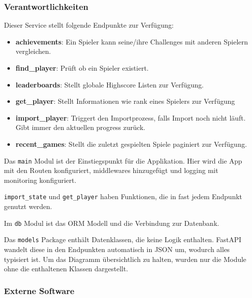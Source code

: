\subsubsection{Verantwortlichkeiten}

Dieser Service stellt folgende Endpunkte zur Verfügung:
\begin{itemize}
    \item \textbf{achievements}: Ein Spieler kann seine/ihre Challenges mit anderen Spielern vergleichen.
    \item \textbf{find\_player}: Prüft ob ein Spieler existiert.
    \item \textbf{leaderboards}: Stellt globale Highscore Listen zur Verfügung.
    \item \textbf{get\_player}: Stellt Informationen wie rank eines Spielers zur Verfügung
    \item \textbf{import\_player}: Triggert den Importprozess, falls Import noch nicht läuft.
    Gibt immer den aktuellen progress zurück.
    \item \textbf{recent\_games}: Stellt die zuletzt gespielten Spiele paginiert zur Verfügung.
\end{itemize}

Das \lstinline!main! Modul ist der Einstiegspunkt für die Applikation.
Hier wird die App mit den Routen konfiguriert, middlewares hinzugefügt und logging mit monitoring konfiguriert.

\lstinline!import_state! und \lstinline!get_player! haben Funktionen, die in fast jedem Endpunkt genutzt werden.

Im \lstinline!db! Modul ist das ORM Modell und die Verbindung zur Datenbank.

Das \lstinline!models! Package enthält Datenklassen, die keine Logik enthalten.
FastAPI wandelt diese in den Endpunkten automatisch in JSON um, wodurch alles typisiert ist.
Um das Diagramm übersichtlich zu halten, wurden nur die Module ohne die enthaltenen Klassen dargestellt.

\subsubsection{Externe Software}

